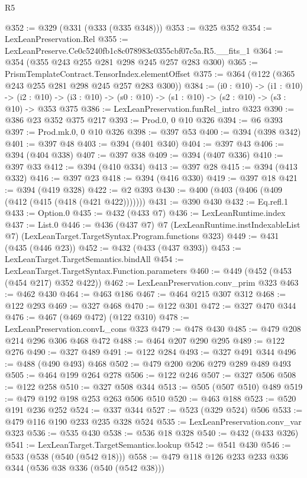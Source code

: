 \begin{lexlean}{R5}
\begin{coremodule}
@352 := @329 (@331 (@333 (@335 @348)))
@353 := @325 @352
@354 := LexLeanPreservation.Rel
@355 := LexLeanPreserve.Ce0c5240fb1c8c078983c0355cbf07c5a.R5.__fits_1
@364 := @354 (@355 @243 @255 @281 @298 @245 @257 @283 @300)
@365 := PrismTemplateContract.TensorIndex.elementOffset
@375 := @364 (@122 (@365 @243 @255 @281 @298 @245 @257 @283 @300))
@384 := (i0 : @10) ->
  (i1 : @10) ->
  (i2 : @10) -> (i3 : @10) -> (s0 : @10) -> (s1 : @10) -> (s2 : @10) -> (s3 : @10) -> @353 @375
@386 := LexLeanPreservation.funRel_intro @323
@390 := @386 @23 @352 @375 @217
@393 := Prod.{0, 0} @10 @326
@394 := @6 @393
@397 := Prod.mk.{0, 0} @10 @326
@398 := @397 @53
@400 := @394 (@398 @342)
@401 := @397 @48
@403 := @394 (@401 @340)
@404 := @397 @43
@406 := @394 (@404 @338)
@407 := @397 @38
@409 := @394 (@407 @336)
@410 := @397 @33
@412 := @394 (@410 @334)
@413 := @397 @28
@415 := @394 (@413 @332)
@416 := @397 @23
@418 := @394 (@416 @330)
@419 := @397 @18
@421 := @394 (@419 @328)
@422 := @2 @393
@430 := @400 (@403 (@406 (@409 (@412 (@415 (@418 (@421 @422)))))))
@431 := @390 @430
@432 := Eq.refl.{1}
@433 := Option.{0}
@435 := @432 (@433 @7)
@436 := LexLeanRuntime.index
@437 := List.{0}
@446 := @436
    (@437 @7)
    @7
    (LexLeanRuntime.instIndexableList @7)
    (LexLeanTarget.TargetSyntax.Program.functions @323)
@449 := @431 (@435 (@446 @23))
@452 := @432 (@433 (@437 @393))
@453 := LexLeanTarget.TargetSemantics.bindAll
@454 := LexLeanTarget.TargetSyntax.Function.parameters
@460 := @449 (@452 (@453 (@454 @217) @352 @422))
@462 := LexLeanPreservation.conv_prim @323
@463 := @462 @430
@464 := @463 @186
@467 := @464 @215 @307 @312
@468 := @122 @293
@469 := @327 @468
@470 := @122 @301
@472 := @327 @470 @344
@476 := @467 (@469 @472) (@122 @310)
@478 := LexLeanPreservation.convL_cons @323
@479 := @478 @430
@485 := @479 @208 @214 @296 @306 @468 @472
@488 := @464 @207 @290 @295
@489 := @122 @276
@490 := @327 @489
@491 := @122 @284
@493 := @327 @491 @344
@496 := @488 (@490 @493) @468
@502 := @479 @200 @206 @279 @289 @489 @493
@505 := @464 @199 @264 @278
@506 := @122 @246
@507 := @327 @506
@508 := @122 @258
@510 := @327 @508 @344
@513 := @505 (@507 @510) @489
@519 := @479 @192 @198 @253 @263 @506 @510
@520 := @463 @188
@523 := @520 @191 @236 @252
@524 := @337 @344
@527 := @523 (@329 @524) @506
@533 := @479 @116 @190 @233 @235 @328 @524
@535 := LexLeanPreservation.conv_var @323
@536 := @535 @430
@538 := @536 @18 @328
@540 := @432 (@433 @326)
@541 := LexLeanTarget.TargetSemantics.lookup
@542 := @541 @430
@546 := @533 (@538 (@540 (@542 @18)))
@558 := @479 @118 @126 @233 @233 @336 @344 (@536 @38 @336 (@540 (@542 @38)))

\end{coremodule}
\end{lexlean}
